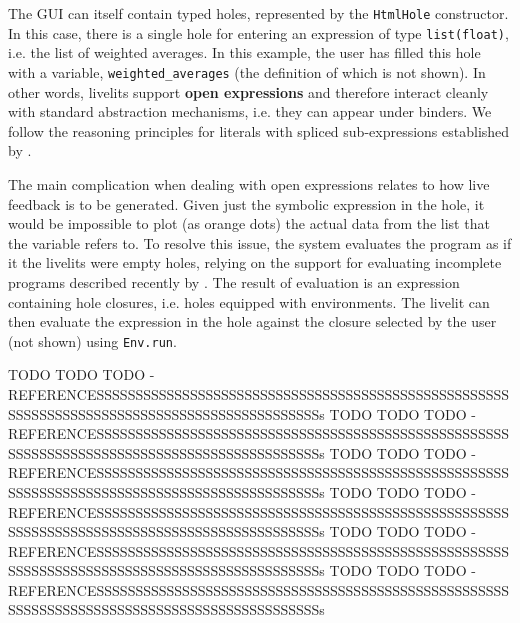 \documentclass[nonacm]{acmart}
\newcommand{\li}[1]{\lstinline[basicstyle=\ttfamily\fontsize{9pt}{1em}\selectfont]{#1}}
\theoremstyle{slplain}
\numberwithin{thm}{section}
\begin{document}
The GUI can itself contain typed holes, represented by the \li{HtmlHole} constructor. In this case, there is a single hole
for entering an expression of type \li{list(float)}, i.e. the list of weighted
averages. In this example, the user has filled this hole with a variable,
\li{weighted_averages} (the definition of which is not shown). In other words,
livelits support \textbf{open expressions} and therefore interact cleanly with 
standard abstraction mechanisms, i.e. they can appear under binders. We follow the reasoning principles for literals with spliced sub-expressions established  by \citet{DBLP:journals/pacmpl/OmarA18}.

The main complication when dealing with open expressions relates to how live feedback
is to be generated. Given just the symbolic expression in the hole, it would be 
impossible to plot (as orange dots) the actual data from the list that the variable refers to. To resolve this issue, the system evaluates the program 
as if it the livelits were empty holes, 
relying on the support for evaluating incomplete programs described recently 
by \citet{DBLP:journals/pacmpl/OmarVCH19}. The result of evaluation is an expression containing
hole closures, i.e. holes equipped with environments. 
The livelit 
can then evaluate the expression in the hole against the closure selected by the user (not shown) using \li{Env.run}.

TODO TODO TODO - REFERENCESSSSSSSSSSSSSSSSSSSSSSSSSSSSSSSSSSSSSSSSSSSSSSSSSSSSSSSSSSSSSSSSSSSSSSSSSSSSSSSSSSSSSSSSSSSSSs
TODO TODO TODO - REFERENCESSSSSSSSSSSSSSSSSSSSSSSSSSSSSSSSSSSSSSSSSSSSSSSSSSSSSSSSSSSSSSSSSSSSSSSSSSSSSSSSSSSSSSSSSSSSSs
TODO TODO TODO - REFERENCESSSSSSSSSSSSSSSSSSSSSSSSSSSSSSSSSSSSSSSSSSSSSSSSSSSSSSSSSSSSSSSSSSSSSSSSSSSSSSSSSSSSSSSSSSSSSs
TODO TODO TODO - REFERENCESSSSSSSSSSSSSSSSSSSSSSSSSSSSSSSSSSSSSSSSSSSSSSSSSSSSSSSSSSSSSSSSSSSSSSSSSSSSSSSSSSSSSSSSSSSSSs
TODO TODO TODO - REFERENCESSSSSSSSSSSSSSSSSSSSSSSSSSSSSSSSSSSSSSSSSSSSSSSSSSSSSSSSSSSSSSSSSSSSSSSSSSSSSSSSSSSSSSSSSSSSSs
TODO TODO TODO - REFERENCESSSSSSSSSSSSSSSSSSSSSSSSSSSSSSSSSSSSSSSSSSSSSSSSSSSSSSSSSSSSSSSSSSSSSSSSSSSSSSSSSSSSSSSSSSSSSs

\clearpage
%


% 
\end{document}
